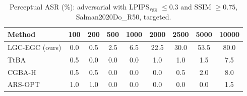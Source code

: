 \begin{table}[t]
\centering\footnotesize
\caption{Perceptual ASR (\%): adversarial with LPIPS$_{\mathrm{vgg}}$ $\le 0.3$ and SSIM $\ge 0.75$, Salman2020Do\_R50, targeted.}
\begin{tabular}{lcccccccc}
\toprule
Method & 100 & 200 & 500 & 1000 & 2000 & 2500 & 5000 & 10000 \\
\midrule
LGC-EGC (ours) & 0.0 & 0.5 & 2.5 & 6.5 & 22.5 & 30.0 & 53.5 & 80.0 \\
TtBA & 0.5 & 0.0 & 0.0 & 0.0 & 1.0 & 1.0 & 1.5 & 7.5 \\
CGBA-H & 0.5 & 0.5 & 0.0 & 0.0 & 0.0 & 0.5 & 2.0 & 8.0 \\
ARS-OPT & 1.0 & 1.0 & 0.0 & 0.0 & 0.0 & 0.0 & 0.0 & 1.5 \\
\bottomrule
\end{tabular}
\end{table}
